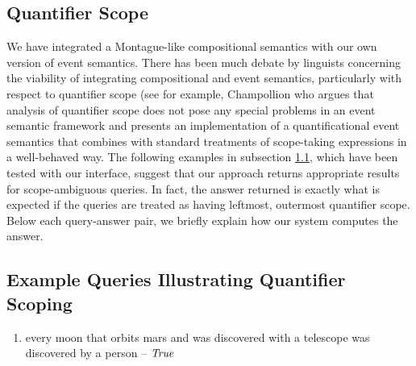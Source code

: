 \documentclass[../main.tex]{subfiles}
\begin{document}
\begin{refsection}
\section{Quantifier Scope}
\label{ext:quantifierscope}

We have integrated a Montague-like \cite{Dowty:wall} compositional semantics with our own
version of event semantics. There has been much debate by linguists concerning the viability of integrating
compositional and event semantics, particularly with respect to quantifier scope (see for example, Champollion
\cite{champollion2015interaction} who argues that analysis of quantifier scope does not pose any special problems in
an event semantic framework and presents an implementation of a quantificational event semantics that
combines with standard treatments of scope-taking expressions in a well-behaved way.
The following examples in subsection \ref{ext:examplequeries}, which have been tested with our interface, suggest that our approach
returns appropriate results for scope-ambiguous queries. In fact, the answer returned is exactly what is
expected if the queries are treated as having leftmost, outermost quantifier scope. Below each query-answer pair, we briefly explain how our system computes the answer.

\subsection{Example Queries Illustrating Quantifier Scoping}
\label{ext:examplequeries}

\begin{enumerate}[before=\small, label=\alph*.]
	\setlength\itemsep{0em}
	\item every moon that orbits mars and was discovered with a telescope was discovered by a person – $\mathit{True}$
\end{enumerate}


\end{refsection}
\end{document}
